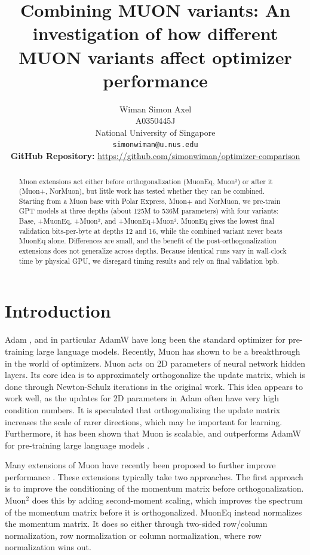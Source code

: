 \documentclass[11pt]{article}
\title{Combining MUON variants: An investigation of how different MUON variants affect optimizer performance}
\author{
    Wiman Simon Axel \\
    A0350445J \\
    National University of Singapore \\
    \texttt{simonwiman@u.nus.edu} \\
    \textbf{GitHub Repository:} \url{https://github.com/simonwiman/optimizer-comparison}
}
\begin{document}
\maketitle

\begin{abstract}
Muon extensions act either before orthogonalization (MuonEq, Muon²) or after it (Muon+, NorMuon), but little work has tested whether they can be combined. Starting from a Muon base with Polar Express, Muon+ and NorMuon, we pre-train GPT models at three depths (about 125M to 536M parameters) with four variants: Base, +MuonEq, +Muon², and +MuonEq+Muon². MuonEq gives the lowest final validation bits-per-byte at depths 12 and 16, while the combined variant never beats MuonEq alone. Differences are small, and the benefit of the post-orthogonalization extensions does not generalize across depths. Because identical runs vary in wall-clock time by physical GPU, we disregard timing results and rely on final validation bpb.
\end{abstract}

\section{Introduction}

Adam \cite{kingma2017adammethodstochasticoptimization}, and in particular AdamW \cite{loshchilov2019decoupledweightdecayregularization} have long been the standard optimizer for pre-training large language models. Recently, Muon \cite{jordan2024muon} has shown to be a breakthrough in the world of optimizers. Muon acts on 2D parameters of neural network hidden layers. Its core idea is to approximately orthogonalize the update matrix, which is done through Newton-Schulz iterations in the original work. This idea appears to work well, as the updates for 2D parameters in Adam often have very high condition numbers. It is speculated that orthogonalizing the update matrix increases the scale of rarer directions, which may be important for learning. Furthermore, it has been shown that Muon is scalable, and outperforms AdamW for pre-training large language models \cite{liu2025muonscalablellmtraining}. 

Many extensions of Muon have recently been proposed to further improve performance \cite{li2025normuonmakingmuonefficient, zhang2026muoneffectivemuonadditional, chang2026muoneqbalancingorthogonalizationlightweight, liu-etal-2026-muon2}. These extensions typically take two approaches. The first approach is to improve the conditioning of the momentum matrix before orthogonalization. Muon$^2$ does this by adding second-moment scaling, which improves the spectrum of the momentum matrix before it is orthogonalized. MuonEq instead normalizes the momentum matrix. It does so either through two-sided row/column normalization, row normalization or column normalization, where row normalization wins out.
\end{document}
